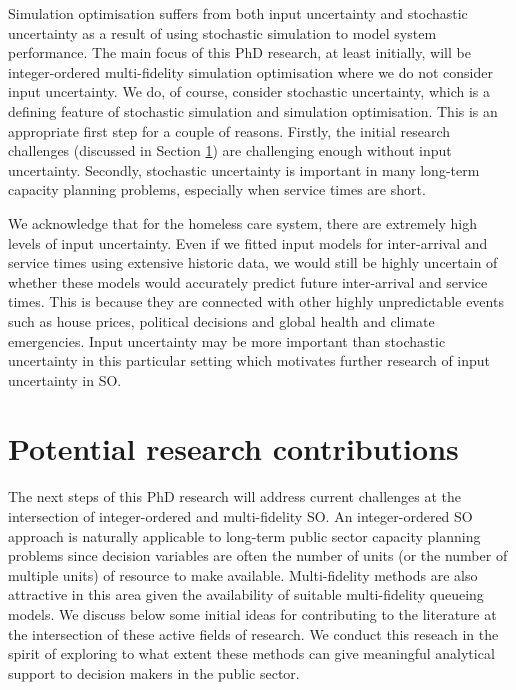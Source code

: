 \documentclass[12pt,a4paper]{article}
\begin{document}
Simulation optimisation suffers from both input uncertainty and stochastic uncertainty as a result of using stochastic simulation to model system performance. The main focus of this PhD research, at least initially, will be integer-ordered multi-fidelity simulation optimisation where we do not consider input uncertainty. We do, of course, consider stochastic uncertainty, which is a defining feature of stochastic simulation and simulation optimisation. This is an appropriate first step for a couple of reasons. Firstly, the initial research challenges (discussed in Section \ref{mfso}) are challenging enough without input uncertainty. Secondly, stochastic uncertainty is important in many long-term capacity planning problems, especially when service times are short. 

We acknowledge that for the homeless care system, there are extremely high levels of input uncertainty. Even if we fitted input models for inter-arrival and service times using extensive historic data, we would still be highly uncertain of whether these models would accurately predict future inter-arrival and service times. This is because they are connected with other highly unpredictable events such as house prices, political decisions and global health and climate emergencies. Input uncertainty may be more important than stochastic uncertainty in this particular setting which motivates further research of input uncertainty in SO. 

\newpage

\section{Potential research contributions} \label{mfso}

The next steps of this PhD research will address current challenges at the intersection of integer-ordered and multi-fidelity SO. An integer-ordered SO approach is naturally applicable to long-term public sector capacity planning problems since decision variables are often the number of units (or the number of multiple units) of resource to make available. Multi-fidelity methods are also attractive in this area given the availability of suitable multi-fidelity queueing models. We discuss below some initial ideas for contributing to the literature at the intersection of these active fields of research. We conduct this reseach in the spirit of exploring to what extent these methods can give meaningful analytical support to decision makers in the public sector.
\end{document}

